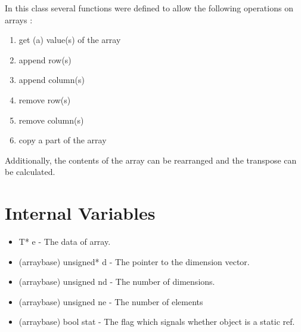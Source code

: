 %

\noindent
In this class several functions were defined to allow the following
operations on arrays :

\vspace*{10mm}

\begin{enumerate}
\item get (a) value(s) of the array
\item append row(s)
\item append column(s)
\item remove row(s)
\item remove column(s)
\item copy a part of the array
\end{enumerate}

\vspace*{10mm}

\noindent
Additionally, the contents of the array can be rearranged and the
transpose can be calculated.

\vspace*{10mm}

\section{Internal Variables}

\begin{itemize}
\item T* e - The data of array.
\item (arraybase) unsigned* d - The pointer to the dimension vector.
\item (arraybase) unsigned nd - The number of dimensions.
\item (arraybase) unsigned ne - The number of elements
\item (arraybase) bool stat - The flag which signals whether object is a static ref.
\end{itemize}


